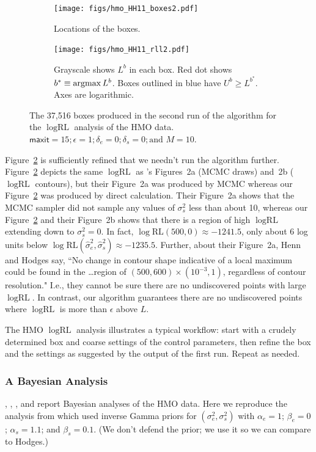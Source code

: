 \documentclass{report}
\newcommand{\textcompute}{\textsf}
\newcommand{\RLorig}{\text{RL}}
\newcommand{\logRLorig}{\log\RLorig}
\newcommand{\sigssq}{\sigma_s^2}
\newcommand{\sigesq}{\sigma_e^2}
\newcommand{\sshat}{\hat\sigma^2_e,\hat\sigma^2_s}
\newcommand{\maxit}{\textcompute{maxit}}
\newcommand{\argmax}{\operatornamewithlimits{argmax}}
\begin{document}
\begin{figure}
  \begin{subfigure}{.5\textwidth}
	\centering
	\texttt{[image: figs/hmo\_HH11\_boxes2.pdf]}
	\caption{Locations of the boxes.}
	\label{fig:hmoboxes2}
  \end{subfigure}
  \begin{subfigure}{.5\textwidth}
	\centering
	\texttt{[image: figs/hmo\_HH11\_rll2.pdf]}
	\caption{Grayscale shows $L^b$ in each box.  Red dot shows $b^* \equiv\argmax L^b$.
	Boxes outlined in blue have $U^b \ge L^{b^*}$.  Axes are logarithmic.}
	\label{fig:hmorll2}
  \end{subfigure}
  \caption{The 37,516 boxes produced in the second run of the algorithm for the
	$\logRLorig$ analysis of the HMO data. $\maxit=15; \epsilon=1;
	\delta_e=0; \delta_s=0; \text{and\ } M=10$.}
  \label{fig:hmo2}
\end{figure}

Figure~\ref{fig:hmorll2} is sufficiently refined that we needn't run the algorithm further.  Figure~\ref{fig:hmorll2} depicts the same $\logRLorig$ as \cite{henn&hodges:2014}'s Figures~2a (MCMC draws) and~2b ($\logRLorig$ contours), but their Figure~2a was produced by MCMC whereas our Figure~\ref{fig:hmorll2} was produced by direct calculation.  Their Figure~2a shows that the MCMC sampler did not sample any values of $\sigssq$ less than about 10, whereas our Figure~\ref{fig:hmorll2} and their Figure~2b shows that there is a region of high $\logRLorig$ extending down to $\sigssq=0$.  In fact, $\logRLorig(500,0) \approx -1241.5$, only about 6 log units below $\logRLorig(\sshat) \approx -1235.5$.  Further, about their Figure~2a, Henn and Hodges say, ``No change in contour shape indicative of a local maximum could be found in the \dots region of $(500, 600) \times (10^{-3}, 1)$, regardless of contour resolution."  I.e., they cannot be sure there are no undiscovered points with large $\logRLorig$.  In contrast, our algorithm guarantees there are no undiscovered points where $\logRLorig$ is more than $\epsilon$ above $L$.

The HMO $\logRLorig$ analysis illustrates a typical workflow: start with a crudely determined box and coarse settings of the control parameters, then refine the box and the settings as suggested by the output of the first run.  Repeat as needed.

\subsubsection{A Bayesian Analysis}
 \cite{hodges:98}, \cite{wakefield:1998}, \cite{hodges:2013}, and \cite{henn&hodges:2014} report  Bayesian analyses of the HMO data.  Here we reproduce the analysis from \cite{hodges:98} which used inverse Gamma priors for $(\sigesq,\sigssq)$ with $\alpha_e = 1$; $\beta_e = 0$; $\alpha_s = 1.1$; and $\beta_s =0.1$.  (We don't defend the prior; we use it so we can compare to Hodges.)
\end{document}
